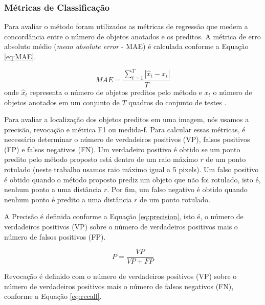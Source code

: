 \subsubsection{Métricas de Classificação}
Para avaliar o método foram utilizados as métricas de regressão que medem a concordância entre o número de objetos anotados e os preditos. A métrica de erro absoluto médio (\textit{mean absolute error} - MAE) é calculada conforme a Equação \ref{eq:MAE}.

\begin{equation}
\label{eq:MAE}
    MAE = \frac{\sum^{T}_{t=1}{|\hat{x}_t-{x}_t|}}{T}
\end{equation}
onde $\hat{x}_t$ representa o número de objetos preditos pelo método e ${x_t}$ o número de objetos anotados em um conjunto de $T$ quadros do conjunto de testes \cite{MAE}. 


Para avaliar a localização dos objetos preditos em uma imagem, nós usamos a precisão, revocação e métrica F1 ou medida-f.
Para calcular essas métricas, é necessário determinar o número de verdadeiros positivos (VP), falsos positivos (FP) e falsos negativos (FN).
Um verdadeiro positivo é obtido se um ponto predito pelo método proposto está dentro de um raio máximo $r$ de um ponto rotulado (neste trabalho usamos raio máximo igual a 5 pixels).
Um falso positivo é obtido quando o método proposto prediz um objeto que não foi rotulado, isto é, nenhum ponto a uma distância $r$.
Por fim, um falso negativo é obtido quando nenhum ponto é predito a uma distância $r$ de um ponto rotulado.

A Precisão é definida conforme a Equação \ref{eq:precision}, isto é, o número de verdadeiros positivos (VP) sobre o número de verdadeiros positivos mais o número de falsos positivos (FP).

\begin{equation}
\label{eq:precision}
    P = \frac{VP}{VP+FP}
\end{equation}

Revocação é definido com o número de verdadeiros positivos (VP) sobre o número de verdadeiros positivos mais o número de falsos negativos (FN), conforme a Equação \ref{eq:recall}.

